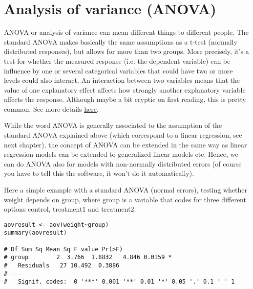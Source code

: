 \documentclass[a4paper,twoside]{tufte-book} %
\begin{document}
\section{Analysis of variance (ANOVA)}

ANOVA or analysis of variance can mean different things to different people. The standard ANOVA makes basically the same assumptions as a t-test (normally distributed responses), but allows for more than two groups. More precisely, it's a test for whether the measured response (i.e. the dependent variable) can be influence by one or several categorical variables that could have two or more levels could also interact. An interaction between two variables means that the value of one explanatory effect affects how strongly another explanatory variable affects the response. Although maybe a bit cryptic on first reading, this is pretty common. See more details \href{biometry.github.io/APES/concepts/interaction.html}{here}.

While the word ANOVA is generally associated to the assumption of the standard ANOVA explained above (which correspond to a linear regression, see next chapter), the concept of ANOVA can be extended in the same way as linear regression models can be extended to generalized linear models etc. Hence, we can do ANOVA also for models with non-normally distributed errors (of course you have to tell this the software, it won't do it automatically). 

Here a simple example with a standard ANOVA (normal errors), testing whether weight depends on group, where group is a variable that codes for three different options control, treatment1 and treatment2:

\begin{lstlisting}
aovresult <- aov(weight~group)
summary(aovresult)

# Df Sum Sq Mean Sq F value Pr(>F)  
# group        2  3.766  1.8832   4.846 0.0159 *
#   Residuals   27 10.492  0.3886                 
# ---
#   Signif. codes:  0 '***' 0.001 '**' 0.01 '*' 0.05 '.' 0.1 ' ' 1
\end{lstlisting}
\end{document}
